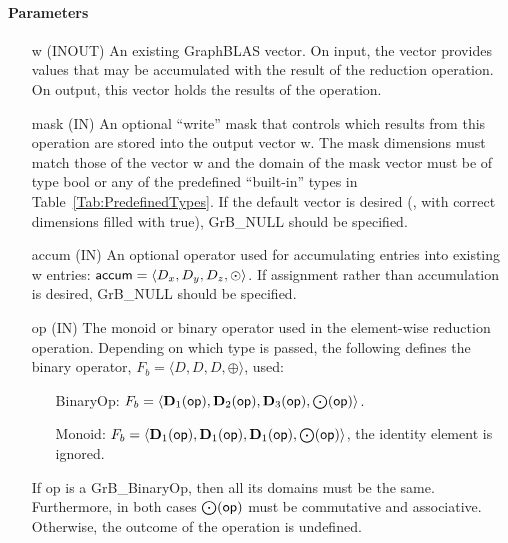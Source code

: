 \paragraph{Parameters}

\begin{itemize}[leftmargin=1.1in]
    \item[{\sf w}]    ({\sf INOUT}) An existing GraphBLAS vector.  On input,
    the vector provides values that may be accumulated with the result of the
    reduction operation.  On output, this vector holds the results of the
    operation.

    \item[{\sf mask}] ({\sf IN}) An optional ``write'' mask that controls which
    results from this operation are stored into the output vector {\sf w}. The 
    mask dimensions must match those of the vector {\sf w} and the domain of the
    {\sf mask} vector must be of type {\sf bool} or any of the predefined 
    ``built-in'' types in Table~\ref{Tab:PredefinedTypes}.  If the default vector
    is desired (\ie, with correct dimensions filled with {\sf true}), 
    {\sf GrB\_NULL} should be specified.

    \item[{\sf accum}]    ({\sf IN}) An optional operator used for accumulating
    entries into existing {\sf w} entries: ${\sf accum} = \langle D_x,
    D_y, D_z,\odot \rangle$. If assignment rather than accumulation is
    desired, {\sf GrB\_NULL} should be specified.

    \item[{\sf op}]    ({\sf IN}) The monoid or binary operator 
    used in the element-wise reduction operation.  Depending on which type is
    passed, the following defines the binary operator, $F_b=\langle D,D,D,\oplus \rangle$, used:
    \begin{itemize}[leftmargin=1.1in]
    \item[BinaryOp:] $F_b = \langle \bold{D}_1({\sf op}), \bold{D}_2({\sf op}),
    \bold{D}_3({\sf op}),\bold{\bigodot}({\sf op})\rangle$.  
    \item[Monoid:] $F_b = \langle \bold{D}_1({\sf op}), \bold{D}_1({\sf op}),
    \bold{D}_1({\sf op}),\bold{\bigodot}({\sf op})\rangle$,
    the identity element is ignored. 
    \end{itemize}
    If {\sf op} is a {\sf GrB\_BinaryOp}, then all its domains must be the same.
    Furthermore, in both cases $\bold{\bigodot}({\sf op})$ must be commutative and associative. Otherwise, the outcome of the operation is undefined.
    

\end{itemize}
